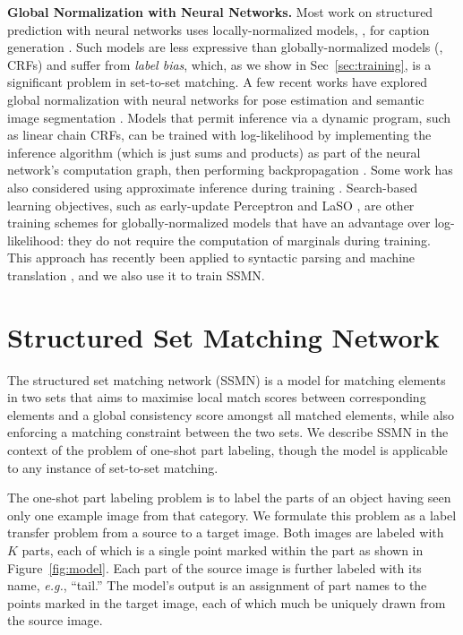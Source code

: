 \documentclass[10pt,twocolumn,letterpaper]{article}
\begin{document}
\noindent\textbf{Global Normalization with Neural Networks.} Most work on structured prediction with neural networks uses locally-normalized models, \eg, for caption generation \cite{karpathy2015}. Such models are less expressive than globally-normalized models (\eg, CRFs) \cite{Andor2016} and suffer from \emph{label bias}\cite{lafferty2001conditional}, which, as we show in Sec~\ref{sec:training}, is a significant problem in set-to-set matching. A few recent works have explored global normalization with neural networks for pose estimation \cite{tompson2014joint} and semantic image segmentation \cite{schwing2015fully,zheng2015}. Models that permit inference via a dynamic program, such as linear chain CRFs, can be trained with log-likelihood by implementing the inference algorithm (which is just sums and products) as part of the neural network's computation graph, then performing backpropagation \cite{Gormley2015,Eisner2016,Yatskar2016,do2010neural,peng2009conditional}. Some work has also considered using approximate inference during training \cite{chen2015learning,tompson2014joint,wang2016proximal}. Search-based learning objectives, such as early-update Perceptron \cite{Collins2004} and LaSO \cite{Daume2005}, are other training schemes for globally-normalized models that have an advantage over log-likelihood: they do not require the computation of marginals during training. This approach has recently been applied to syntactic parsing \cite{Andor2016} and machine translation \cite{Wiseman2016SequencetoSequenceLA}, and we also use it to train SSMN.


\section{Structured Set Matching Network}
\label{sec:model}

The structured set matching network (SSMN) is a model for matching elements in two sets that aims to maximise local match scores between corresponding elements and a global consistency score amongst all matched elements, while also enforcing a matching constraint between the two sets. We describe SSMN in the context of the problem of one-shot part labeling, though the model is applicable to any instance of set-to-set matching.

The one-shot part labeling problem is to label the parts of an object having seen only one example image from that category. We formulate this problem as a label transfer problem from a source to a target image. Both images are labeled with $K$ parts, each of which is a single point marked within the part as shown in Figure~\ref{fig:model}. Each part of the source image is further labeled with its name, \emph{e.g.}, ``tail.'' The model's output is an assignment of part names to the points marked in the target image, each of which much be uniquely drawn from the source image.
\end{document}
